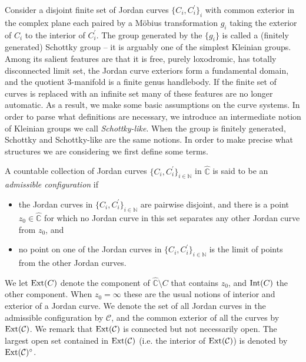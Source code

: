 \documentclass[12pt]{amsart}
\theoremstyle{plain}
\DeclareMathOperator{\Int}{\rm Int}
\DeclareMathOperator{\Ext}{\rm Ext}
\begin{document}
Consider a disjoint  finite  set of Jordan curves  $\{C_i ,C_i^{\prime}\}_{i}$ with common exterior  in the complex plane each   paired by a M\"obius transformation $g_i$ taking the exterior of $C_i$ to the interior of 
$C_i^{\prime}$. The group generated by the $\{g_i\}$ is called a (finitely generated) Schottky group -- it is arguably one of the simplest  Kleinian groups.  Among its salient features   are that  it is free, purely loxodromic, has totally disconnected   limit set,  the   Jordan curve exteriors  form a fundamental domain,  and the quotient  $3$-manifold is 
a finite genus handlebody. 
If the finite set of curves is replaced with an infinite set many of these features are no longer automatic. As a result,  we make some basic assumptions on the curve systems. In order to parse what definitions are necessary, we introduce an intermediate notion of Kleinian groups we call {\it Schottky-like}. When the group is finitely generated,  Schottky and Schottky-like are the same notions. In order to make precise what structures we are considering we first define some terms. 

A countable collection of Jordan curves 
$\{C_i ,C_i^{\prime}\}_{i \in \mathbb N}$ in \(\widehat{\mathbb{C}}\) is said to be an {\em admissible configuration} if
\begin{itemize} 
\item the Jordan curves in $\{C_i ,C_i^{\prime}\}_{i \in \mathbb N}$ are pairwise disjoint, and there is a 
point \(z_0 \in \widehat{\mathbb{C}}\) for which no Jordan curve in this set separates any other Jordan curve 
from \(z_0\), and
\item no point on one of the Jordan curves in $\{C_i ,C_i^{\prime}\}_{i \in \mathbb N}$ is the limit of points from  
the other Jordan curves.
\end{itemize}


We let \(\Ext(C)\) denote the component of 
$\widehat{\mathbb C}\setminus C$ that contains $z_0$, and \(\Int(C)\) the 
other component. When \(z_0= \infty \) these are the usual notions of interior and exterior of a Jordan curve.
We denote the set of all Jordan curves in the admissible configuration by 
$\mathcal{C}$, and the common exterior of all the 
curves by $\Ext (\mathcal{C})$. We remark that $\Ext (\mathcal{C})$ is connected but not necessarily open.
The largest open set contained in $\Ext (\mathcal{C})$ (i.e. the interior of $\Ext (\mathcal{C})$) is denoted by 
$\Ext (\mathcal{C})^{\circ}$.
\end{document}
